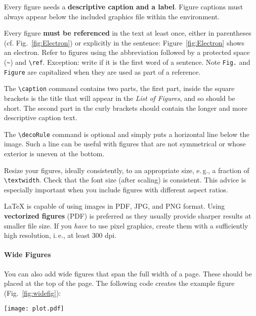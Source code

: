 Every figure needs a \textbf{descriptive caption and a label}. Figure captions must always appear below the included graphics file within the  environment.

Every figure \textbf{must be referenced} in the text at least once, either in parentheses (cf. Fig.~\ref{fig:Electron}) or explicitly in the sentence: Figure~\ref{fig:Electron} shows an electron. Refer to figures using the abbreviation  followed by a protected space (\verb|~|) and \verb|\ref|. Exception: write  if it is the first word of a sentence. Note \verb|Fig.| and \verb|Figure| are capitalized when they are used as part of a reference.

The \verb|\caption| command contains two parts,%
the first part, inside the square brackets is the title that will appear in the \emph{List of Figures}, and so should be short.
 The second part in the curly brackets should contain the longer and more descriptive caption text.

The \verb|\decoRule| command is optional and simply puts a horizontal line below the image. Such a line can be useful with figures that are not symmetrical or whose exterior is uneven at the bottom.

Resize your figures, ideally consistently, to an appropriate size, e.\,g., a fraction of \texttt{\textbackslash textwidth}. Check that the font size (after scaling) is consistent. This advice is especially important when you include figures with different aspect ratios.

LaTeX is capable of using images in PDF, JPG, and PNG format. Using \textbf{vectorized figures} (PDF) is preferred as they usually provide sharper results at smaller file size. If you \emph{have} to use pixel graphics, create them with a sufficiently high resolution, i.\,e., at least 300 dpi.


\paragraph{Wide Figures} You can also add wide figures that span the full width of a page. These should be placed at the top of the page. The following code creates the example figure (Fig.~\ref{fig:widefig}):
\begin{latex}
\begin{figure*}[t] %
\texttt{[image: plot.pdf]}
\caption{\label{fig:widefig}
  This is a full-width figure. Lorem ipsum dolor sit amet, …
}
\end{figure*}
\end{latex}


